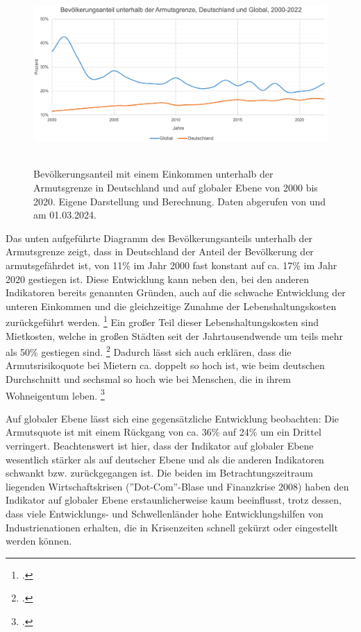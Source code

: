 \begin{figure}[h]
    \centering
    \includegraphics[height=6.9cm]{Bilder/Armutsgrenze2.png}
    \caption[Bevölkerungsanteil unterhalb der Armutsgrenze, Deutschland und global, 2000-2020]{Bevölkerungsanteil mit einem Einkommen unterhalb der Armutsgrenze in Deutschland und auf globaler Ebene von 2000 bis 2020. Eigene Darstellung und Berechnung. Daten abgerufen von \cite[][(global)]{wb_armutsquote_global_2022} und \cite[][(Deutschland)]{bmas_arb_armutsrisikoquote_2023} am 01.03.2024.}
    \label{fig:iso_norm}
\end{figure}

Das unten aufgeführte Diagramm des Bevölkerungsanteils unterhalb der Armutsgrenze zeigt, dass in Deutschland der Anteil der Bevölkerung der armutsgefährdet ist, von 11\% im Jahr 2000 fast konstant auf ca. 17\% im Jahr 2020 gestiegen ist. Diese Entwicklung kann neben den, bei den anderen Indikatoren bereits genannten Gründen, auch auf die schwache Entwicklung der unteren Einkommen und die gleichzeitige Zunahme der Lebenshaltungskosten zurückgeführt werden. \footcite[Vgl. ][S. 17 (Country-Sheets)]{wir_2022} Ein gro{\ss}er Teil dieser Lebenshaltungskosten sind Mietkosten, welche in gro{\ss}en Städten seit der Jahrtausendwende um teils mehr als 50\% gestiegen sind. \footcite[Vgl. ][S. 494]{kholodilin_mietpreisbremse_2016} Dadurch lässt sich auch erklären, dass die Armutsrisikoquote bei Mietern ca. doppelt so hoch ist, wie beim deutschen Durchschnitt und sechsmal so hoch wie bei Menschen, die in ihrem Wohneigentum leben. \footcite[Vgl. ][S. 458]{grabka_einkommensverteilung_2018}

Auf globaler Ebene lässt sich eine gegensätzliche Entwicklung beobachten: Die Armutsquote ist mit einem Rückgang von ca. 36\% auf 24\% um ein Drittel verringert. Beachtenswert ist hier, dass der Indikator auf globaler Ebene wesentlich stärker als auf deutscher Ebene und als die anderen Indikatoren schwankt bzw. zurückgegangen ist. Die beiden im Betrachtungszeitraum liegenden Wirtschaftskrisen (''Dot-Com''-Blase und Finanzkrise 2008) haben den Indikator auf globaler Ebene erstaunlicherweise kaum beeinflusst, trotz dessen, dass viele Entwicklungs- und Schwellenländer hohe Entwicklungshilfen von Industrienationen erhalten, die in Krisenzeiten schnell gekürzt oder eingestellt werden können.

